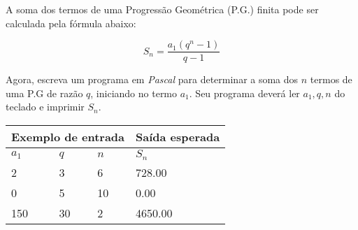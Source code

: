 \item A soma dos termos de uma Progressão Geométrica (P.G.) finita pode ser 
calculada pela fórmula abaixo:

\[
S_n = \frac{a_1 (q^n - 1)}{q - 1}
\]

Agora, escreva um programa em \emph{Pascal} para determinar a soma dos $n$ 
termos de uma P.G de razão $q$, iniciando no termo $a_1$. Seu programa
deverá ler $a_1, q, n$ do teclado e imprimir $S_n$.

\begin{center}
\begin{tabular}{|l|l|l|l|} \hline
\multicolumn{3}{|c|}{Exemplo de entrada} & Saída esperada \\ \hline
$a_1$ & $q$ & $n$   & $S_n$               \\ \hline
2 & 3 & 6         & 728.00                \\ \hline
0 & 5 & 10          & 0.00             \\ \hline
150 & 30 & 2         & 4650.00          \\ \hline
\end{tabular}
\end{center}